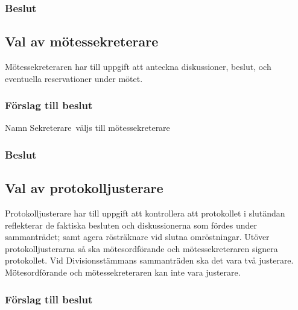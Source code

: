 \documentclass[protokoll]{dvd}
\def\sekr{Namn Sekreterare}
\begin{document}
\subsubsection*{Beslut}
\begin{attsatser}
    \item %
\end{attsatser}

\subsection{Val av mötessekreterare}

Mötessekreteraren har till uppgift att anteckna diskussioner, beslut, och eventuella reservationer under mötet.

\subsubsection*{Förslag till beslut}
\begin{attsatser}
    \item \sekr\ väljs till mötessekreterare
\end{attsatser}

\subsubsection*{Beslut}
\begin{attsatser}
    \item %
\end{attsatser}

\subsection{Val av protokolljusterare}

Protokolljusterare har till uppgift att kontrollera att protokollet i slutändan reflekterar de faktiska besluten och diskussionerna som fördes under sammanträdet; samt agera rösträknare vid slutna omröstningar.
Utöver protokolljusterarna så ska mötesordförande och mötessekreteraren signera protokollet.
Vid Divisionsstämmans sammanträden ska det vara två justerare.\\
Mötesordförande och mötessekreteraren kan inte vara justerare.

\subsubsection*{Förslag till beslut}
\begin{attsatser}
    \item 
\end{attsatser}
\end{document}
